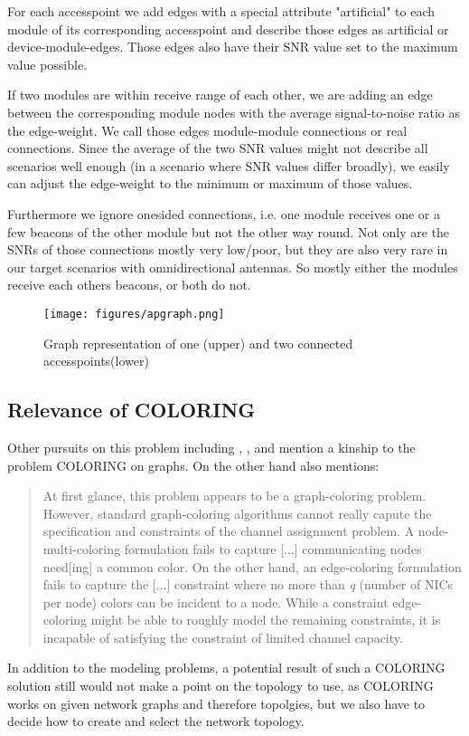     For each accesspoint we add edges with a special attribute "artificial" 
    to each module of its corresponding accesspoint and describe those edges as artificial or device-module-edges.
    Those edges also have their SNR value set to the maximum value possible. 
    
    If two modules are within receive range of each other, 
    we are adding an edge between the corresponding module nodes with the average signal-to-noise ratio as the edge-weight.
    We call those edges module-module connections or real connections.
    Since the average of the two SNR values might not describe all scenarios well enough (in a scenario where SNR values differ broadly),
    we easily can adjust the edge-weight to the minimum or maximum of those values.
    
    Furthermore we ignore onesided connections, i.e. one module receives one or a few beacons of the other module but not the other way round.
    Not only are the SNRs of those connections mostly very low/poor, but they are also very rare in our target scenarios with omnidirectional antennas.
    So mostly either the modules receive each others beacons, or both do not.
    \begin{figure}[th!]
      \centering
      \texttt{[image: figures/apgraph.png]}
      \caption{Graph representation of one (upper) and two connected accesspoints(lower)}
      \label{fig:apgraph}
    \end{figure}
    
  \subsection{Relevance of COLORING}
    Other pursuits on this problem including \cite{BFS-CA}, \cite{CTA}, \cite{caa_tricky} and \cite{katzela} mention a kinship to the problem COLORING on graphs.
    On the other hand \cite{caa_tricky} also mentions:
    \begin{quote}
     At first glance, this problem appears to be a graph-coloring problem. However, standard graph-coloring algorithms cannot really capute the specification and constraints 
     of the channel assignment problem. A node-multi-coloring formulation fails to capture [...] communicating nodes need[ing] a common color. On the other hand,
     an edge-coloring formulation fails to capture the [...] constraint where no more than \textit{q} (number of NICs per node) colors can be incident to a node.
     While a constraint edge-coloring might be able to roughly model the remaining constraints, it is incapable of satisfying the constraint of limited channel capacity.
    \end{quote}
    In addition to the modeling problems, a potential result of such a COLORING solution still would not make a point on the topology to use,
    as COLORING works on given network graphs and therefore topolgies, but we also have to decide how to create and select the network topology.
